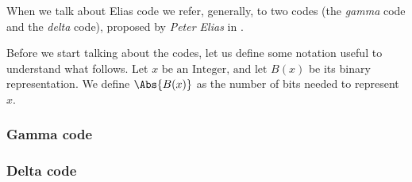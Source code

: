 \documentclass{subfiles}
\begin{document}
    When we talk about Elias code we refer, generally, 
        to two codes (the \emph{gamma} code and the \emph{delta} code),
        proposed by \emph{Peter Elias} in \cite{elias1975}.

    Before we start talking about the codes,
        let us define some notation useful to understand what follows.
        Let \(x \text{ be an Integer, and let } B(x)\) be its binary representation.
        We define \(\Abs{B(x)}\) as the number of bits needed to represent \(x\).

    \subsubsection{Gamma code}
    

    \subsubsection{Delta code}
    
\end{document}
